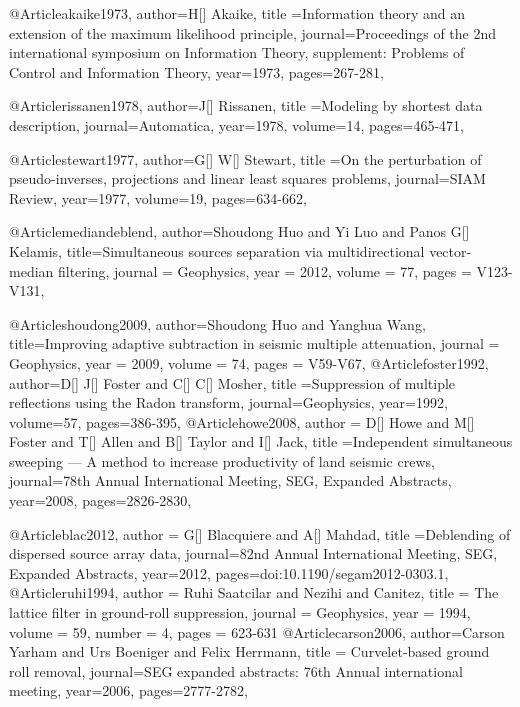 @Article{akaike1973,
  author={H[] Akaike},
  title ={Information theory and an extension of the maximum likelihood principle},
  journal={Proceedings of the 2nd international symposium on Information Theory, supplement: Problems of Control and Information Theory},
  year=1973,
  pages={267-281},
}

@Article{rissanen1978,
  author={J[] Rissanen},
  title ={Modeling by shortest data description},
  journal={Automatica},
  year=1978,
  volume=14,
  pages={465-471},
}





@Article{stewart1977,
  author={G[] W[] Stewart},
  title ={On the perturbation of pseudo-inverses, projections and linear least squares problems},
  journal={SIAM Review},
  year=1977,
  volume=19,
  pages={634-662},
}

@Article{mediandeblend,
  author={Shoudong Huo and Yi Luo and Panos G[] Kelamis},
  title={Simultaneous sources separation via multidirectional vector-median filtering},
  journal = 	 {Geophysics},
  year = 	 2012,
  volume =	 77,
  pages =	 {V123-V131},
}

@Article{shoudong2009,
  author={Shoudong Huo and Yanghua Wang},
  title={Improving adaptive subtraction in seismic multiple attenuation},
  journal = 	 {Geophysics},
  year = 	 2009,
  volume =	 74,
  pages =	 {V59-V67},
}
@Article{foster1992,
  author={D[] J[] Foster and C[] C[] Mosher},
  title ={Suppression of multiple reflections using the Radon transform},
  journal={Geophysics},
  year=1992,
  volume=57,
  pages={386-395},
}
@Article{howe2008,
  author = {D[] Howe and M[] Foster and T[] Allen and B[] Taylor and I[] Jack},
  title ={Independent simultaneous sweeping — A
method to increase productivity of land seismic crews},
  journal={78th Annual International Meeting, SEG,
Expanded Abstracts},
  year=2008,
  pages={2826-2830},
}

@Article{blac2012,
  author = {G[] Blacquiere and A[] Mahdad},
  title ={Deblending of dispersed source array data},
  journal={82nd Annual International Meeting, SEG, Expanded Abstracts},
  year=2012,
  pages={doi:10.1190/segam2012-0303.1},
}
@Article{ruhi1994,
  author = 	 {Ruhi Saatcilar and Nezihi and Canitez},
  title = 	 {The lattice filter in ground-roll suppression},
  journal = 	 {Geophysics},
  year = 	 1994,
  volume = 	 59,
  number = 	 4,
  pages = 	 {623-631}}
@Article{carson2006,
  author={Carson Yarham and Urs Boeniger and Felix Herrmann},
  title = {Curvelet-based ground roll removal},
  journal={SEG expanded abstracts: 76th Annual international meeting},
  year=2006,
  pages={2777-2782},
}

